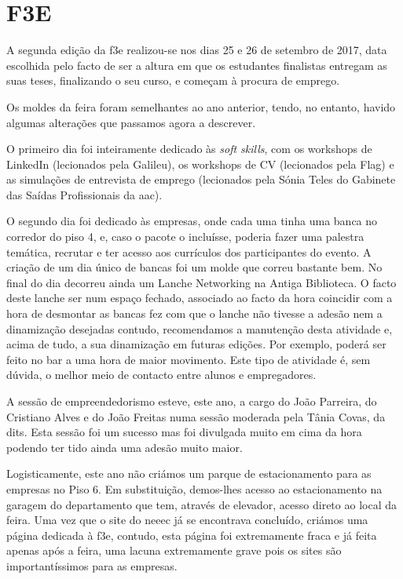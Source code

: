 
\section{F3E}

A segunda edição da \acrlong{f3e} realizou-se nos dias 25 e 26 de setembro de 2017, data escolhida pelo facto de ser a altura em que os estudantes finalistas entregam as suas teses, finalizando o seu curso, e começam à procura de emprego. 

Os moldes da feira foram semelhantes ao ano anterior, tendo, no entanto, havido algumas alterações que passamos agora a descrever.

O primeiro dia foi inteiramente dedicado às \textit{soft skills}, com os workshops de LinkedIn (lecionados pela Galileu), os workshops de CV (lecionados pela Flag) e as simulações de entrevista de emprego (lecionados pela Sónia Teles do Gabinete das Saídas Profissionais da \acrshort{aac}).

O segundo dia foi dedicado às empresas, onde cada uma tinha uma banca no corredor do piso 4, e, caso o pacote o incluísse, poderia fazer uma palestra temática, recrutar e ter acesso aos currículos dos participantes do evento. A criação de um dia único de bancas foi um molde que correu bastante bem. No final do dia decorreu ainda um Lanche Networking na Antiga Biblioteca. O facto deste lanche ser num espaço fechado, associado ao facto da hora coincidir com a hora de desmontar as bancas fez com que o lanche não tivesse a adesão nem a dinamização desejadas contudo, recomendamos a manutenção desta atividade e, acima de tudo, a sua dinamização em futuras edições. Por exemplo, poderá ser feito no bar a uma hora de maior movimento. Este tipo de atividade é, sem dúvida, o melhor meio de contacto entre alunos e empregadores.

A sessão de empreendedorismo esteve, este ano, a cargo do João Parreira, do Cristiano Alves e do João Freitas numa sessão moderada pela Tânia Covas, da \acrshort{dits}. Esta sessão foi um sucesso mas foi divulgada muito em cima da hora podendo ter tido ainda uma adesão muito maior.

Logisticamente, este ano não criámos um parque de estacionamento para as empresas no Piso 6. Em substituição, demos-lhes acesso ao estacionamento na garagem do departamento que tem, através de elevador, acesso direto ao local da feira. Uma vez que o site do \acrshort{neeec} já se encontrava concluído, criámos uma página dedicada à \acrshort{f3e}, contudo, esta página foi extremamente fraca e já feita apenas após a feira, uma lacuna extremamente grave pois os sites são importantíssimos para as empresas.

